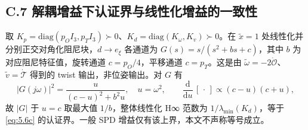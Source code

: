 \subsection*{C.7 解耦增益下认证界与线性化增益的一致性}

取 $K_p=\mathrm{diag}(p_OI_3,p_TI_3)\succ0$、$K_d=\mathrm{diag}(K_\omega,K_v)\succ0$。在 $\tilde x=1$ 处线性化并分别正交对角化阻尼块，$d\to e_\xi$ 各通道为 $G(s)=s/(s^2+bs+c)$，其中 $b$ 为对应阻尼特征值，旋转通道 $c=p_O/4$，平移通道 $c=p_T$。这是由 $\tilde\omega=-2\dot{\mathcal O}$、$\tilde v=\dot{\mathcal T}$ 得到的 twist 输出，非位姿输出。对 $G$ 有
\begin{equation}
|G(j\omega)|^2=\frac{u}{(c-u)^2+b^2u},\quad u=\omega^2,\qquad
\frac{\mathrm{d}}{\mathrm{d}u}\,[\,\cdot\,]\propto(c-u)(c+u),
\tag{5.10}\label{eq:5.10}
\end{equation}
故 $|G|$ 于 $u=c$ 取最大值 $1/b$，整体线性化 H∞ 范数为 $1/\lambda_{\min}(K_d)$，等于 \eqref{eq:5.6c} 的认证界。一般 SPD 增益仅有该上界，本文不声称等号成立。
